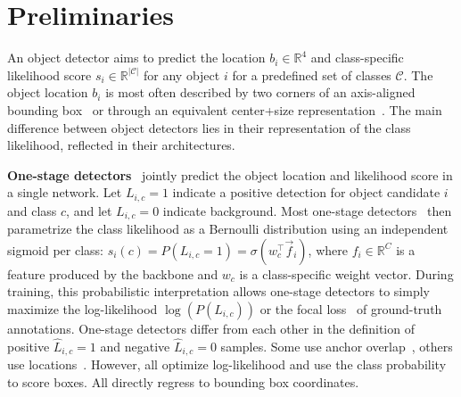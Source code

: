 \documentclass{article}
\begin{document}
\section{Preliminaries}

An object detector aims to predict the location $b_i \in \mathbb{R}^4$ and class-specific likelihood score $s_i \in \mathbb{R}^{|\mathcal{C}|}$ for any object $i$ for a predefined set of classes $\mathcal{C}$.
The object location $b_i$ is most often described by two corners of an axis-aligned bounding box~\cite{ren2015faster,carion2020end} or through an equivalent center+size representation~\cite{tian2019fcos,zhou2019objects,zhu2020deformable}.
The main difference between object detectors lies in their representation of the class likelihood, reflected in their architectures.

\textbf{One-stage detectors}~\cite{redmon2018yolov3,lin2018focal,tian2019fcos,zhou2019objects} jointly predict the object location and likelihood score in a single network.
Let $L_{i,c}=1$ indicate a positive detection for object candidate $i$ and class $c$, and let $L_{i,c}=0$ indicate background.
Most one-stage detectors~\cite{lin2018focal,tian2019fcos,zhou2019objects} then parametrize the class likelihood as a Bernoulli distribution using an independent sigmoid per class: $s_i(c) = P(L_{i,c}=1) = \sigma(w_c^\top \vec f_i)$, where $f_i \in \mathbb{R}^C$ is a feature produced by the backbone and $w_c$ is a class-specific weight vector.
During training, this probabilistic interpretation allows one-stage detectors to simply maximize the log-likelihood $\log(P(L_{i,c}))$ or the focal loss~\cite{lin2018focal} of ground-truth annotations.
One-stage detectors differ from each other in the definition of positive $\hat L_{i,c}=1$ and negative $\hat L_{i,c}=0$ samples.
Some use anchor overlap~\cite{lin2018focal,zhang2020bridging,paa-eccv2020}, others use locations~\cite{tian2019fcos}.
However, all optimize log-likelihood and use the class probability to score boxes.
All directly regress to bounding box coordinates.
\end{document}
